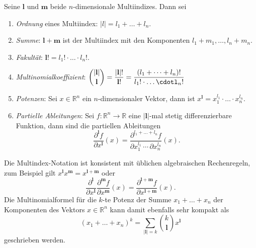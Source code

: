 \begin{definition}
Seine $\mathbf{l}$ und $\mathbf{m}$ beide $n$-dimensionale Multiindizes.
Dann sei
\begin{enumerate}
\item {\em Ordnung} eines Multiindex: $|l|=l_1+\dots+l_n$.
%
\item {\em Summe}: $\mathbf{l}+\mathbf{m}$ ist der Multiindex mit
den Komponenten $l_1+m_1,\dots,l_n+m_n$.
\item {\em Fakultät}: $\mathbf{l}! = l_1!\cdot \ldots\cdot l_n!$.
%
\item {\em Multinomialkoeffizient}: $\displaystyle
\index{Multinomialkoeffizient}%
\binom{|\mathbf{l}|}{\mathbf{l}}
=
\frac{|\mathbf{l}|!}{\mathbf{l}!}
=
\frac{(l_1+\dots+l_n)!}{l_1!\cdot\ldots\cdotl_n!}
$
\item {\em Potenzen}: Sei $x\in\mathbb{R}^n$ ein $n$-dimensionaler Vektor,
dann ist $x^{\mathbf{l}} = x_1^{l_1}\cdot\ldots\cdot x_n^{l_n}$.
\item {\em Partielle Ableitungen}: Sei $f\colon\mathbb{R}^n\to\mathbb{R}$
eine $|\mathbf{l}|$-mal stetig differenzierbare Funktion, dann sind die
partiellen Ableitungen
\[
\frac{\partial^{\mathbf{l}} f}{\partial x^{\mathbf{l}}}(x)
=
\frac{\partial^{l_1+\dots+l_n} f}{\partial x_1^{l_1}\,\cdots\,\partial x_n^{l_n}}(x).
\]
\end{enumerate}
\end{definition}
Die Multindex-Notation ist konsistent mit üblichen algebraischen
Rechenregeln, zum Beispiel gilt
$x^{\mathbf{l}}x^{\mathbf{m}}=x^{\mathbf{l}+\mathbf{m}}$
oder 
\[
\frac{\partial^{\mathbf{l}}}{\partial x^{\mathbf{l}}}
\frac{\partial^{\mathbf{m}}f}{\partial x^{\mathbf{m}}}(x)
=
\frac{\partial^{\mathbf{l}+\mathbf{m}}f}{\partial x^{\mathbf{l}+\mathbf{m}}}(x).
\]
Die Multinomialformel für die $k$-te Potenz der Summe
$x_1+\dots+x_n$ der Komponenten des Vektors $x\in\mathbb{R}^n$
kann damit ebenfalls sehr kompakt als
\[
(x_1+\dots+x_n)^{k}
=
\sum_{|\mathbf{l}|=k}
\binom{k}{\mathbf{l}} x^{\mathbf{l}}
\]
geschrieben werden.

%
%
